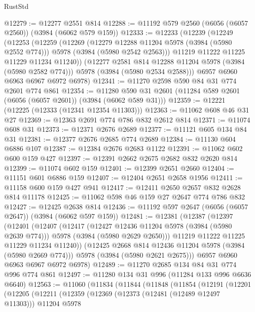 \begin{lexlean}{RustStd}
\begin{coremodule}
@12279 := @12277 @2551 @814
@12288 := @11192 @579 @2560 (@6056 (@6057 @2560)) (@3984 (@6062 @579 @159))
@12333 := @12233
    (@12239
      (@12249
        (@12253
          (@12259
            (@12269
              (@12279 @12288 @11204 @5978 (@3984 (@5980 @2552 @774)))
              @5978
              (@3984 (@5980 @2542 @2563)))
            @11219
            @11222
            @11225
            @11229
            @11234
            @11240))
        (@12277 @2581 @814 @12288 @11204 @5978 (@3984 (@5980 @2582 @774)))
        @5978
        (@3984 (@5980 @2534 @2588)))
      @6957
      @6960
      @6963
      @6967
      @6972
      @6978)
@12341 := @11270 @2598 @590 @84 @31 @774 @2601 @774 @861
@12354 := @11280 @590 @31 @2601 (@11284 @589 @2601 (@6056 (@6057 @2601)) (@3984 (@6062 @589 @31)))
@12359 := @12221 (@12225 (@12333 (@12341 @12354 @11303)))
@12363 := @11062 @608 @46 @31 @27
@12369 := @12363 @2691 @774 @786 @832 @2612 @814
@12371 := @11074 @608 @31
@12373 := @12371 @2676 @2689
@12377 := @11121 @605 @134 @84 @31
@12381 := @12377 @2676 @2685 @774 @2689
@12384 := @11130 @604 @6886 @107
@12387 := @12384 @2676 @2683 @1122
@12391 := @11062 @602 @600 @159 @427
@12397 := @12391 @2662 @2675 @2682 @832 @2620 @814
@12399 := @11074 @602 @159
@12401 := @12399 @2651 @2660
@12404 := @11151 @601 @6886 @159
@12407 := @12404 @2651 @2658 @1956
@12411 := @11158 @600 @159 @427 @941
@12417 := @12411 @2650 @2657 @832 @2628 @814 @11178
@12425 := @11062 @598 @46 @159 @27 @2647 @774 @786 @832
@12427 := @12425 @2638 @814
@12436 := @11192 @597 @2647 (@6056 (@6057 @2647)) (@3984 (@6062 @597 @159))
@12481 := @12381
    (@12387
      (@12397
        (@12401
          (@12407
            (@12417
              (@12427 @12436 @11204 @5978 (@3984 (@5980 @2639 @774)))
              @5978
              (@3984 (@5980 @2629 @2650)))
            @11219
            @11222
            @11225
            @11229
            @11234
            @11240))
        (@12425 @2668 @814 @12436 @11204 @5978 (@3984 (@5980 @2669 @774)))
        @5978
        (@3984 (@5980 @2621 @2675)))
      @6957
      @6960
      @6963
      @6967
      @6972
      @6978)
@12489 := @11270 @2685 @134 @84 @31 @774 @996 @774 @861
@12497 := @11280 @134 @31 @996 (@11284 @133 @996 @6636 @6640)
@12563 := @11060
    (@11834
      (@11844
        (@11848
          (@11854
            (@12191
              (@12201
                (@12205
                  (@12211
                    (@12359
                      (@12369
                        (@12373 (@12481 (@12489 @12497 @11303)))
                        @11204
                        @5978

\end{coremodule}
\end{lexlean}
